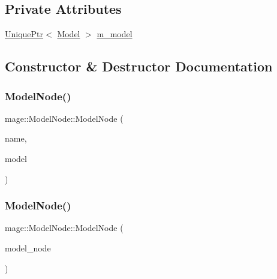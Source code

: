 \subsection*{Private Attributes}
\begin{DoxyCompactItemize}
\item 
\hyperlink{namespacemage_a8c307fbcc33bce9b7f2aa4c26c3b95cf}{Unique\+Ptr}$<$ \hyperlink{classmage_1_1_model}{Model} $>$ \hyperlink{classmage_1_1_model_node_a784faf19f736a1c74808321ed0e52d36}{m\+\_\+model}
\end{DoxyCompactItemize}


\subsection{Constructor \& Destructor Documentation}
\hypertarget{classmage_1_1_model_node_a15d6a41cc5cdc90310313147100c1d6f}{}\label{classmage_1_1_model_node_a15d6a41cc5cdc90310313147100c1d6f} 
\subsubsection{\texorpdfstring{Model\+Node()}{ModelNode()}\hspace{0.1cm}{\footnotesize\ttfamily [1/3]}}
{\footnotesize\ttfamily mage\+::\+Model\+Node\+::\+Model\+Node (\begin{DoxyParamCaption}\item[{const string \&}]{name,  }\item[{\hyperlink{namespacemage_a8c307fbcc33bce9b7f2aa4c26c3b95cf}{Unique\+Ptr}$<$ \hyperlink{classmage_1_1_model}{Model} $>$ \&\&}]{model }\end{DoxyParamCaption})\hspace{0.3cm}{\ttfamily [explicit]}}

\hypertarget{classmage_1_1_model_node_a409c098ddecf20d1b393d43c15d16482}{}\label{classmage_1_1_model_node_a409c098ddecf20d1b393d43c15d16482} 
\subsubsection{\texorpdfstring{Model\+Node()}{ModelNode()}\hspace{0.1cm}{\footnotesize\ttfamily [2/3]}}
{\footnotesize\ttfamily mage\+::\+Model\+Node\+::\+Model\+Node (\begin{DoxyParamCaption}\item[{const \hyperlink{classmage_1_1_model_node}{Model\+Node} \&}]{model\+\_\+node }\end{DoxyParamCaption})}

